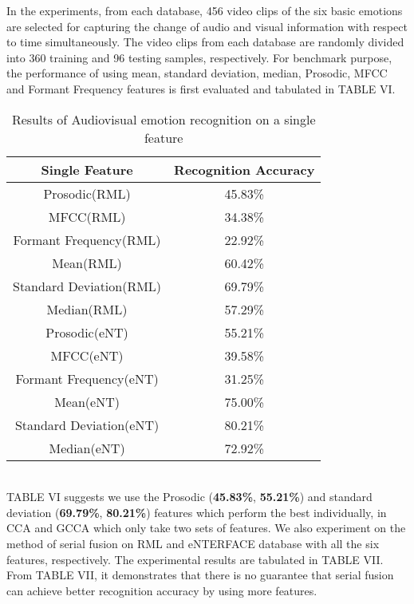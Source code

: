 \documentclass[journal]{IEEEtran}
\begin{document}
In the experiments, from each database, 456 video clips of the six basic emotions are selected for capturing the change of audio and visual information with respect to time simultaneously. The video clips from each database are randomly divided into 360 training and 96 testing samples, respectively. For benchmark purpose, the performance of using mean, standard deviation, median, Prosodic, MFCC and Formant Frequency features is first evaluated and tabulated in TABLE VI.\\\indent
\vspace*{-10pt}
\begin{table}[h]
\small
\renewcommand{\arraystretch}{1.4}
\caption{\normalsize{Results of Audiovisual emotion recognition on a single feature}}
\setlength{\abovecaptionskip}{0pt}
\setlength{\belowcaptionskip}{10pt}
\centering
\tabcolsep 0.073in
\begin{tabular}{cc}
\hline
Single Feature & Recognition Accuracy\\
\hline
Prosodic(RML) &45.83\%\\
MFCC(RML) &34.38\%\\
Formant Frequency(RML) &22.92\%\\
Mean(RML) &60.42\%\\
Standard Deviation(RML) &69.79\%\\
Median(RML) &57.29\%\\
Prosodic(eNT) &55.21\%\\
MFCC(eNT) &39.58\%\\
Formant Frequency(eNT) &31.25\%\\
Mean(eNT) &75.00\%\\
Standard Deviation(eNT) &80.21\%\\
Median(eNT) &72.92\%\\
\hline
\end{tabular}
\end{table}\\\indent
TABLE VI suggests we use the Prosodic (\textbf{45.83\%}, \textbf{55.21\%}) and standard deviation (\textbf{69.79\%}, \textbf{80.21\%}) features which perform the best individually, in CCA and GCCA which only take two sets of features. We also experiment on the method of serial fusion on RML and eNTERFACE database with all the six features, respectively. The experimental results are tabulated in TABLE VII. From TABLE VII, it demonstrates that there is no guarantee that serial fusion can achieve better recognition accuracy by using more features.\\
\end{document}
